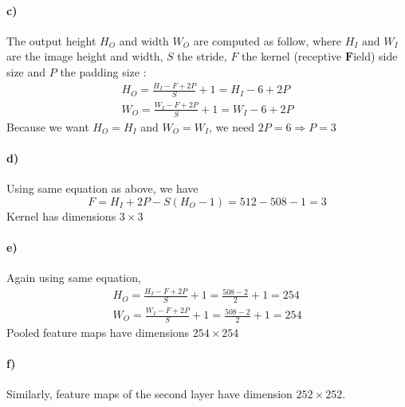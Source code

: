 \documentclass{article}
\begin{document}
		\paragraph{c)} 
		The output height $H_O$ and width $W_O$ are computed as follow, where $H_I \text{ and } W_I $ are the image height and width, $S$ the stride, $F$ the kernel (receptive $\textbf{F}$ield) side size and $P$ the padding size  : 
		\[
		\begin{aligned}
			H_O = \frac{H_I - F + 2P}{S} + 1 = H_I - 6 + 2P\\
			W_O = \frac{W_I - F + 2P}{S} + 1 = W_I - 6 + 2P 			
		\end{aligned}
		\]
		Because we want $H_O = H_I$ and $W_O = W_I$, we need $2P = 6 \Rightarrow P = 3$
		
		\paragraph{d)}
		Using same equation as above, we have
		\[
		F = H_I + 2P - S(H_O - 1) = 512 - 508 - 1 = 3
		\]
		Kernel has dimensions $ 3 \times 3 $
		
		\paragraph{e)}
		Again using same equation,
		\[ 
		\begin{aligned}
		H_O = \frac{H_I - F + 2P}{S} + 1 = \frac{508 - 2}{2} + 1 = 254 \\
		W_O = \frac{W_I - F + 2P}{S} + 1 = \frac{508 - 2}{2} + 1 = 254
		\end{aligned}
		\]
		Pooled feature maps have dimensions $254 \times 254$
		
		\paragraph{f)}
		Similarly, feature maps of the second layer have dimension $252 \times 252$.		
		
\end{document}
